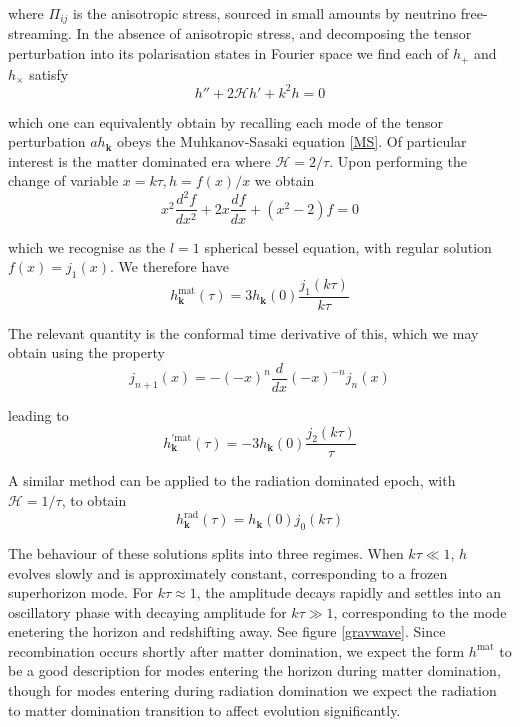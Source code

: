 \documentclass[a4paper,10pt]{article}
\renewcommand{\v}[1]{\mathbf{#1}}
\begin{document}
where $\Pi_{ij}$ is the anisotropic stress, sourced in small amounts by neutrino free-streaming. In the absence of anisotropic stress, and decomposing the tensor perturbation into its polarisation states in Fourier space we find each of $h_+$ and $h_\times$ satisfy
\begin{equation}
h''+2\mathcal{H}h'+k^2h = 0
\end{equation}

which one can equivalently obtain by recalling each mode of the tensor perturbation $ah_\v{k}$ obeys the Muhkanov-Sasaki equation \ref{MS}.  Of particular interest is the matter dominated era where $\mathcal{H}=2/\tau$. Upon performing the change of variable $x=k\tau,  h=f(x)/x$ we obtain
\begin{equation}
x^2\frac{d^2f}{dx^2}+2x\frac{df}{dx}+(x^2-2)f=0
\end{equation}

which we recognise as the $l=1$ spherical bessel equation, with regular solution $f(x) = j_1(x)$. We therefore have
\begin{equation}
h^{\text{mat}}_\v{k}(\tau) = 3h_\v{k}(0)\frac{j_1(k\tau)}{k\tau}
\end{equation}

The relevant quantity is the conformal time derivative of this, which we may obtain using the property
\begin{equation}
j_{n+1}(x)=-(-x)^n\frac{d}{dx}(-x)^{-n}j_n(x)
\end{equation}

leading to 
\begin{equation}
h^{'\text{mat}}_\v{k}(\tau) = -3h_\v{k}(0)\frac{j_2(k\tau)}{\tau}
\end{equation}

A similar method can be applied to the radiation dominated epoch, with $\mathcal{H}=1/\tau$, to obtain
\begin{equation}
h^{\text{rad}}_\v{k}(\tau) = h_\v{k}(0)j_0({k\tau})
\end{equation}

The behaviour of these solutions splits into three regimes. When $k\tau\ll 1$, $h$ evolves slowly and is approximately constant, corresponding to a frozen superhorizon mode. For $k\tau\approx1$, the amplitude decays rapidly and settles into an oscillatory phase with decaying amplitude for $k\tau \gg 1$, corresponding to the mode enetering the horizon and redshifting away. See figure \ref{gravwave}. Since recombination occurs shortly after matter domination, we expect the form $h^{\text{mat}}$ to be a good description for modes entering the horizon during matter domination, though for modes entering during radiation domination we expect the radiation to matter domination transition to affect evolution significantly.\\
\end{document}
